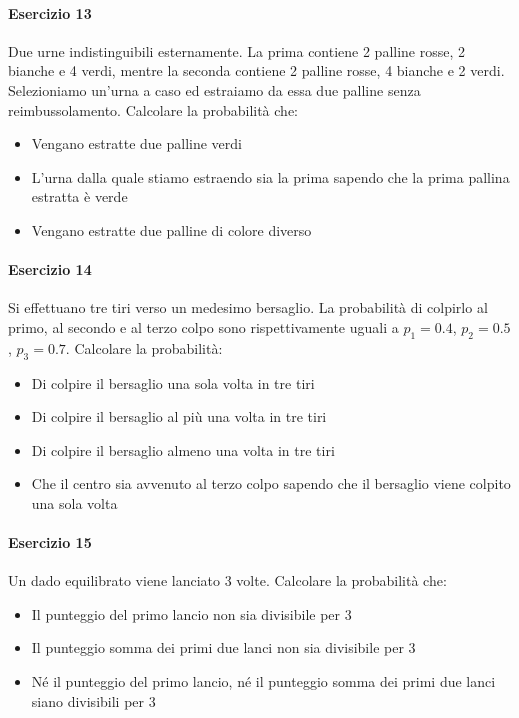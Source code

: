 \documentclass[12pt]{article}
\begin{document}
    \paragraph{Esercizio 13}
    Due urne indistinguibili esternamente. La prima contiene 2 palline rosse, 2 bianche e 4 verdi, mentre la seconda contiene 2 palline rosse, 4 bianche e 2 verdi. Selezioniamo un’urna a caso ed estraiamo da essa due palline senza reimbussolamento. Calcolare la probabilità che:
    \begin{itemize}
        \item Vengano estratte due palline verdi
        \item L’urna dalla quale stiamo estraendo sia la prima sapendo che la prima pallina estratta è verde
        \item Vengano estratte due palline di colore diverso
    \end{itemize}
    \paragraph{Esercizio 14}
    Si effettuano tre tiri verso un medesimo bersaglio. La probabilità di colpirlo al primo, al secondo e al terzo colpo sono rispettivamente uguali a $p_1=0.4$, $p_2=0.5$, $p_3=0.7$. Calcolare la probabilità:
    \begin{itemize}
        \item Di colpire il bersaglio una sola volta in tre tiri
        \item Di colpire il bersaglio al più una volta in tre tiri
        \item Di colpire il bersaglio almeno una volta in tre tiri
        \item Che il centro sia avvenuto al terzo colpo sapendo che il bersaglio viene colpito una sola volta
    \end{itemize}
    \paragraph{Esercizio 15}
    Un dado equilibrato viene lanciato 3 volte. Calcolare la probabilità che:
    \begin{itemize}
        \item Il punteggio del primo lancio non sia divisibile per 3
        \item Il punteggio somma dei primi due lanci non sia divisibile per 3
        \item Né il punteggio del primo lancio, né il punteggio somma dei primi due lanci siano divisibili per 3
    \end{itemize}
    \newpage
\end{document}
